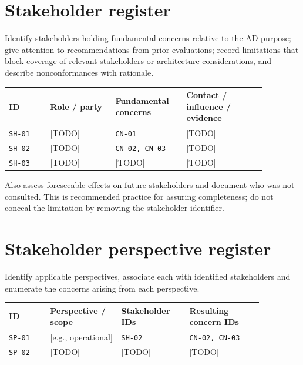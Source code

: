 \documentclass[11pt,letterpaper]{article}
\begin{document}
\section{Stakeholder register \texorpdfstring{}{(6.2)}}
\begin{Requirement}\FlagReq{} Identify stakeholders holding fundamental concerns relative to the AD purpose; give attention to recommendations from prior evaluations; record limitations that block coverage of relevant stakeholders or architecture considerations, and describe nonconformances with rationale. \end{Requirement}
\begin{longtable}{p{0.14\linewidth}p{0.22\linewidth}p{0.24\linewidth}p{0.27\linewidth}}\toprule
\textbf{ID} & \textbf{Role / party} & \textbf{Fundamental concerns} & \textbf{Contact / influence / evidence}\\\midrule\endhead
\texttt{SH-01} & [TODO] & \texttt{CN-01} & [TODO]\\
\texttt{SH-02} & [TODO] & \texttt{CN-02, CN-03} & [TODO]\\
\texttt{SH-03} & [TODO] & [TODO] & [TODO]\\\bottomrule\end{longtable}
\begin{Guidance}Also assess foreseeable effects on future stakeholders and document who was not consulted. This is recommended practice for assuring completeness; do not conceal the limitation by removing the stakeholder identifier.\end{Guidance}
\section{Stakeholder perspective register \texorpdfstring{}{(6.3)}}
\begin{Requirement}\FlagReq{} Identify applicable perspectives, associate each with identified stakeholders and enumerate the concerns arising from each perspective. \end{Requirement}
\begin{longtable}{p{0.14\linewidth}p{0.24\linewidth}p{0.23\linewidth}p{0.25\linewidth}}\toprule
\textbf{ID} & \textbf{Perspective / scope} & \textbf{Stakeholder IDs} & \textbf{Resulting concern IDs}\\\midrule\endhead
\texttt{SP-01} & [e.g., operational] & \texttt{SH-02} & \texttt{CN-02, CN-03}\\
\texttt{SP-02} & [TODO] & [TODO] & [TODO]\\\bottomrule\end{longtable}
\end{document}
